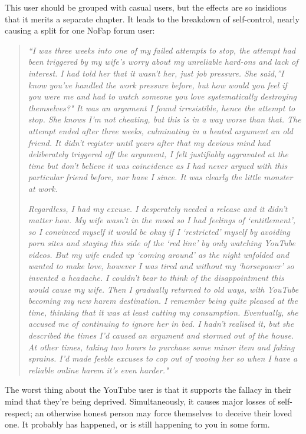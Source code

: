 \documentclass[
]{book}
\begin{document}
This user should be grouped with casual users, but the effects are so insidious that it merits a separate chapter. It leads to the breakdown of self-control, nearly causing a split for one NoFap forum user:

\begin{quote}
\emph{``I was three weeks into one of my failed attempts to stop, the attempt had been triggered by my wife's worry about my unreliable hard-ons and lack of interest. I had told her that it wasn't her, just job pressure. She said,''I know you've handled the work pressure before, but how would you feel if you were me and had to watch someone you love systematically destroying themselves?" It was an argument I found irresistible, hence the attempt to stop. She knows I'm not cheating, but this is in a way worse than that. The attempt ended after three weeks, culminating in a heated argument an old friend. It didn't register until years after that my devious mind had deliberately triggered off the argument, I felt justifiably aggravated at the time but don't believe it was coincidence as I had never argued with this particular friend before, nor have I since. It was clearly the little monster at work.}

\emph{Regardless, I had my excuse. I desperately needed a release and it didn't matter how. My wife wasn't in the mood so I had feelings of `entitlement', so I convinced myself it would be okay if I `restricted' myself by avoiding porn sites and staying this side of the `red line' by only watching YouTube videos. But my wife ended up `coming around' as the night unfolded and wanted to make love, however I was tired and without my `horsepower' so invented a headache. I couldn't bear to think of the disappointment this would cause my wife. Then I gradually returned to old ways, with YouTube becoming my new harem destination. I remember being quite pleased at the time, thinking that it was at least cutting my consumption. Eventually, she accused me of continuing to ignore her in bed. I hadn't realised it, but she described the times I'd caused an argument and stormed out of the house. At other times, taking two hours to purchase some minor item and faking sprains. I'd made feeble excuses to cop out of wooing her so when I have a reliable online harem it's even harder."}
\end{quote}

The worst thing about the YouTube user is that it supports the fallacy in their mind that they're being deprived. Simultaneously, it causes major losses of self-respect; an otherwise honest person may force themselves to deceive their loved one. It probably has happened, or is still happening to you in some form.
\end{document}

